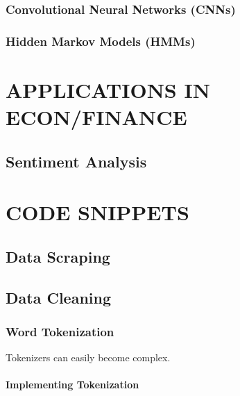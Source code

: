 \documentclass[
]{book}
\begin{document}
\hypertarget{convolutional-neural-networks-cnns}{%
\section{Convolutional Neural Networks (CNNs)}\label{convolutional-neural-networks-cnns}}

\hypertarget{hidden-markov-models-hmms}{%
\section{Hidden Markov Models (HMMs)}\label{hidden-markov-models-hmms}}

\hypertarget{part-applications-in-econfinance}{%
\part*{APPLICATIONS IN ECON/FINANCE}\label{part-applications-in-econfinance}}

\hypertarget{sentiment-analysis}{%
\chapter{Sentiment Analysis}\label{sentiment-analysis}}

\hypertarget{part-code-snippets}{%
\part*{CODE SNIPPETS}\label{part-code-snippets}}

\hypertarget{data-scraping}{%
\chapter{Data Scraping}\label{data-scraping}}

\hypertarget{data-cleaning}{%
\chapter{Data Cleaning}\label{data-cleaning}}

\hypertarget{word-tokenization}{%
\section{Word Tokenization}\label{word-tokenization}}

Tokenizers can easily become complex.

\hypertarget{implementing-tokenization}{%
\subsection{Implementing Tokenization}\label{implementing-tokenization}}
\end{document}
